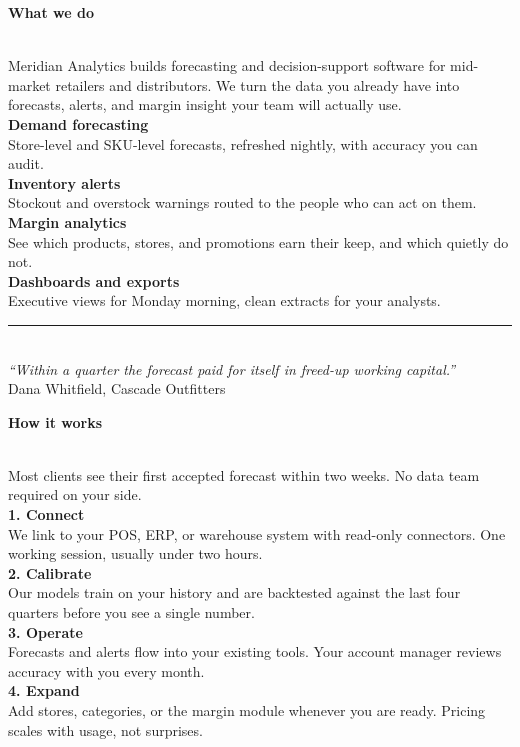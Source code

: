\documentclass[10pt]{article}
\newcommand{\panelhead}[1]{%
  \colorbox{accent}{\parbox[c][0.95cm][c]{\dimexpr\linewidth-2\fboxsep}{%
    \centering\color{white}\large\bfseries #1}}\\[8pt]}
\newenvironment{panel}
  {\begin{minipage}[t][16.5cm][t]{0.301\textwidth}\raggedright}
  {\end{minipage}}
\newcommand{\svc}[2]{{\bfseries\color{accent}#1}\\[1pt]
  {\small\color{inkgray}#2}\\[7pt]}
\begin{document}
\begin{panel}
  \panelhead{What we do}
  {\small Meridian Analytics builds forecasting and decision-support
  software for mid-market retailers and distributors. We turn the data
  you already have into forecasts, alerts, and margin insight your team
  will actually use.}\\[10pt]

  \svc{Demand forecasting}{Store-level and SKU-level forecasts, refreshed
  nightly, with accuracy you can audit.}
  \svc{Inventory alerts}{Stockout and overstock warnings routed to the
  people who can act on them.}
  \svc{Margin analytics}{See which products, stores, and promotions earn
  their keep, and which quietly do not.}
  \svc{Dashboards and exports}{Executive views for Monday morning, clean
  extracts for your analysts.}

  \vspace{4pt}
  {\color{gold}\rule{\linewidth}{1.5pt}}\\[6pt]
  {\small\itshape\color{inkgray}``Within a quarter the forecast paid for
  itself in freed-up working capital.''}\\[2pt]
  {\footnotesize\color{inkgray}Dana Whitfield, Cascade Outfitters}
\end{panel}\hfill
\begin{panel}
  \panelhead{How it works}
  {\small Most clients see their first accepted forecast within two
  weeks. No data team required on your side.}\\[10pt]

  \svc{1. Connect}{We link to your POS, ERP, or warehouse system with
  read-only connectors. One working session, usually under two hours.}
  \svc{2. Calibrate}{Our models train on your history and are backtested
  against the last four quarters before you see a single number.}
  \svc{3. Operate}{Forecasts and alerts flow into your existing tools.
  Your account manager reviews accuracy with you every month.}
  \svc{4. Expand}{Add stores, categories, or the margin module whenever
  you are ready. Pricing scales with usage, not surprises.}

  \vspace{4pt}
  \begin{center}
  \end{center}
\end{panel}\hfill
\end{document}

